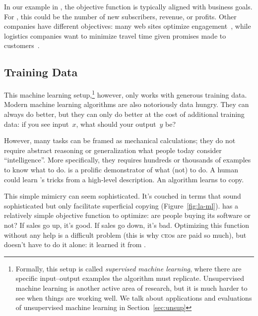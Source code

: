 In our example in \crunchyCity{}, the objective function is typically
aligned with business goals.
%
For \energyCompany{}, this could be the number of new subscribers,
revenue, or profits.
%
Other companies have different objectives:
many web sites optimize engagement~\citep{hoiles-17}, while logistics
companies want to minimize travel time given promises made to customers~\citep{fiat-16}.



\subsection{Training Data}

This machine learning setup,\footnote{Formally, this setup is called
  \emph{supervised machine learning}, where there are specific
  input--output examples the algorithm must replicate.  Unsupervised
  machine learning is another active area of research, but it is much
  harder to see when things are working well.  We talk about
  applications and evaluations of unsupervised machine learning in
  Section~\ref{sec:unsup}} however, only works with generous training
data.  Modern machine learning algorithms are also notoriously data
hungry.  They can always do better, but they can only do better at the
cost of additional training data: if you see input~$x$, what should
your output~$y$ be?

However, many tasks can be framed as mechanical calculations; they
do not require abstract reasoning or generalization what people today
consider ``intelligence''.  More specifically, they requires hundreds
or thousands of examples to know what to do.  \energyJerk{} is a
prolific demonstrator of what (not) to do.  A human could learn
\energyJerk{}'s tricks from a high-level description.  An algorithm
learns to copy. 

This simple mimicry can seem sophisticated.  It's couched in terms
that sound sophisticated but only facilitate superficial copying
(Figure~\ref{fig:la-ml}).  \energyCompany{} has a relatively simple
objective function to optimize: are people buying its
software or not?  If sales go up, it's good.  If sales go down, it's
bad.  Optimizing this function without any help is a difficult problem
(this is why \textsc{ceo}s are paid so much), but \energyCompany{}
doesn't have to do it alone: it learned it from \energyJerk{}.

